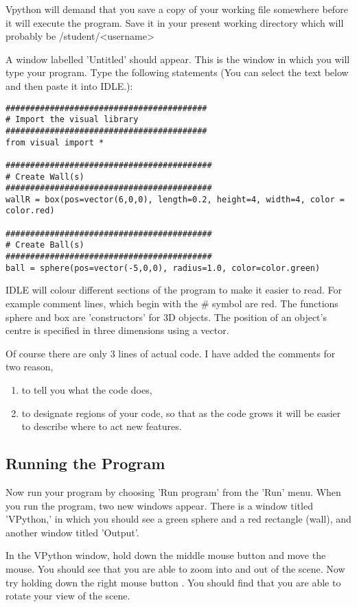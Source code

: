 \documentclass[12pt]{article}
\begin{document}
Vpython will demand that you save a copy of your working file
somewhere before it will execute the program. Save it in your
present working directory which will probably be /student/<username>


A window labelled 'Untitled' should appear.
This is the window in which you will type your program.
Type the following statements
(You can select the text below and then paste it into IDLE.):
{\color{code}
\begin{verbatim}
#########################################
# Import the visual library
#########################################
from visual import *

##########################################
# Create Wall(s)
##########################################
wallR = box(pos=vector(6,0,0), length=0.2, height=4, width=4, color = color.red)

##########################################
# Create Ball(s)
##########################################
ball = sphere(pos=vector(-5,0,0), radius=1.0, color=color.green)
\end{verbatim}}
IDLE will colour different sections of the program to make it easier to read.
For example comment lines, which begin with the \# symbol are red.
The functions {\color{code}sphere} and {\color{code}box} are 'constructors' for 3D objects.
The position of an object's centre is specified in three dimensions
using a vector.

Of course there are only 3 lines of actual code. I have added the comments for two reason,
\begin{enumerate}
\item to tell you what the code does,
\item to designate regions of your code, so that as the code grows it will be easier to describe where to act new features.
\end{enumerate}

\subsection{Running the Program}
Now run your program by choosing 'Run program' from the 'Run' menu.
When you run the program, two new windows appear.
There is a window titled 'VPython,' in which you should see a green sphere and a red rectangle (wall), and another window titled 'Output'.

In the VPython window, hold down the middle mouse button and move the mouse. You should see that you are able to zoom into and out of the scene.
Now try holding down the right mouse button .
You should find that you are able to rotate your view of the scene.
\end{document}
